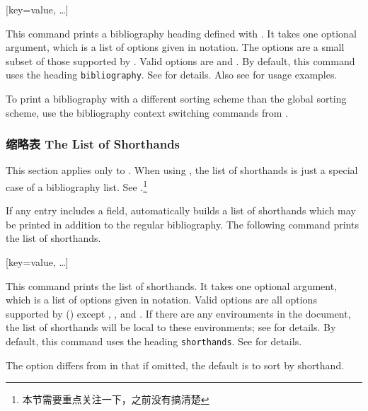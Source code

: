 \begin{ltxsyntax}
[key=value, \dots]

This command prints a bibliography heading defined with . It takes one optional argument, which is a list of options given in \keyval notation. The options are a small subset of those supported by . Valid options are  and . By default, this command uses the heading \texttt{bibliography}. See  for details. Also see  for usage examples.

\end{ltxsyntax}
%
To print a bibliography with a different sorting scheme than the global sorting scheme, use the bibliography context switching commands from .

\subsubsection{缩略表 The List of Shorthands}
\label{use:bib:los}

\BibTeXOnlyMark This section applies only to \bibtex. When using \biber, the list of shorthands is just a special case of a bibliography list. See .\footnote{本节需要重点关注一下，之前没有搞清楚}

If any entry includes a  field,  automatically builds a list of shorthands which may be printed in addition to the regular bibliography. The following command prints the list of shorthands.

\begin{ltxsyntax}

[key=value, \dots]

This command prints the list of shorthands. It takes one optional argument, which is a list of options given in \keyval notation. Valid options are all options supported by  () except , , and . If there are any  environments in the document, the list of shorthands will be local to these environments; see  for details. By default, this command uses the heading \texttt{shorthands}. See  for details.

The  option differs from  in that if omitted, the default is to sort by shorthand.

\end{ltxsyntax}

